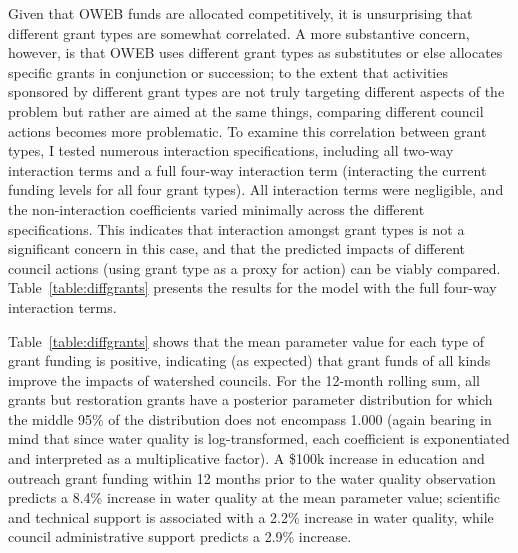 \documentclass[12pt,a4paper,titlepage]{article}
\begin{document}
Given that OWEB funds are allocated competitively, it is unsurprising that different grant types are somewhat correlated. A more substantive concern, however, is that OWEB uses different grant types as substitutes or else allocates specific grants in conjunction or succession; to the extent that activities sponsored by different grant types are not truly targeting different aspects of the problem but rather are aimed at the same things, comparing different council actions becomes more problematic. To examine this correlation between grant types, I tested numerous interaction specifications, including all two-way interaction terms and a full four-way interaction term (interacting the current funding levels for all four grant types). All interaction terms were negligible, and the non-interaction coefficients varied minimally across the different specifications. This indicates that interaction amongst grant types is not a significant concern in this case, and that the predicted impacts of different council actions (using grant type as a proxy for action) can be viably compared. Table~\ref{table:diffgrants} presents the results for the model with the full four-way interaction terms.


Table~\ref{table:diffgrants} shows that the mean parameter value for each type of grant funding is positive, indicating (as expected) that grant funds of all kinds improve the impacts of watershed councils. For the 12-month rolling sum, all grants but restoration grants have a posterior parameter distribution for which the middle 95\% of the distribution does not encompass 1.000 (again bearing in mind that since water quality is log-transformed, each coefficient is exponentiated and interpreted as a multiplicative factor). A \$100k increase in education and outreach grant funding within 12 months prior to the water quality observation predicts a 8.4\% increase in water quality at the mean parameter value; scientific and technical support is associated with a 2.2\% increase in water quality, while council administrative support predicts a 2.9\% increase.


\end{document}
